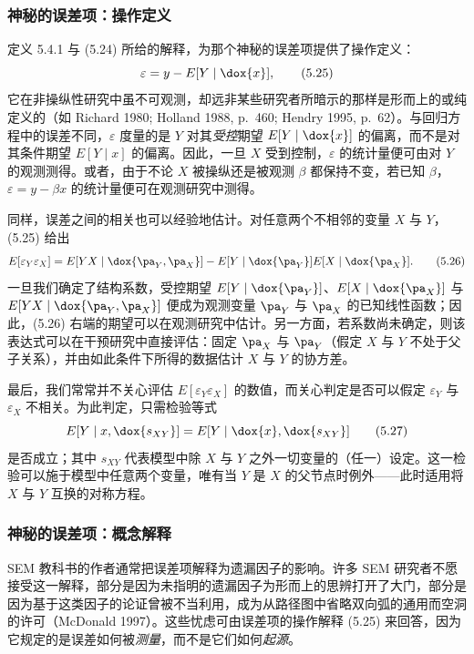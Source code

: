 \subsubsection*{神秘的误差项：操作定义}

定义 5.4.1 与 \textup{(5.24)} 所给的解释，为那个神秘的误差项提供了操作定义：
\begin{equation}
\varepsilon=y-E[Y\mid \dox{x}], \tag{5.25}
\end{equation}
它在非操纵性研究中虽不可观测，却远非某些研究者所暗示的那样是形而上的或纯定义的（如 Richard 1980; Holland 1988, p.~460; Hendry 1995, p.~62）。与回归方程中的误差不同，$\varepsilon$ 度量的是 $Y$ 对其\emph{受控}期望 $E[Y\mid \dox{x}]$ 的偏离，而不是对其条件期望 $E[Y\mid x]$ 的偏离。因此，一旦 $X$ 受到控制，$\varepsilon$ 的统计量便可由对 $Y$ 的观测测得。或者，由于不论 $X$ 被操纵还是被观测 $\beta$ 都保持不变，若已知 $\beta$，$\varepsilon=y-\beta x$ 的统计量便可在观测研究中测得。

同样，误差之间的相关也可以经验地估计。对任意两个不相邻的变量 $X$ 与 $Y$，\textup{(5.25)} 给出
\begin{equation}
E[\varepsilon_Y\varepsilon_X]=E[YX\mid \dox{\pa_Y,\pa_X}]-E[Y\mid \dox{\pa_Y}]E[X\mid \dox{\pa_X}]. \tag{5.26}
\end{equation}
一旦我们确定了结构系数，受控期望 $E[Y\mid \dox{\pa_Y}]$、$E[X\mid \dox{\pa_X}]$ 与 $E[YX\mid \dox{\pa_Y,\pa_X}]$ 便成为观测变量 $\pa_Y$ 与 $\pa_X$ 的已知线性函数；因此，\textup{(5.26)} 右端的期望可以在观测研究中估计。另一方面，若系数尚未确定，则该表达式可以在干预研究中直接评估：固定 $\pa_X$ 与 $\pa_Y$（假定 $X$ 与 $Y$ 不处于父子关系），并由如此条件下所得的数据估计 $X$ 与 $Y$ 的协方差。

最后，我们常常并不关心评估 $E[\varepsilon_Y\varepsilon_X]$ 的数值，而关心判定是否可以假定 $\varepsilon_Y$ 与 $\varepsilon_X$ 不相关。为此判定，只需检验等式
\begin{equation}
E[Y\mid x,\dox{s_{XY}}]=E[Y\mid \dox{x},\dox{s_{XY}}] \tag{5.27}
\end{equation}
是否成立；其中 $s_{XY}$ 代表模型中除 $X$ 与 $Y$ 之外一切变量的（任一）设定。这一检验可以施于模型中任意两个变量，唯有当 $Y$ 是 $X$ 的父节点时例外——此时适用将 $X$ 与 $Y$ 互换的对称方程。

\subsubsection*{神秘的误差项：概念解释}

SEM 教科书的作者通常把误差项解释为遗漏因子的影响。许多 SEM 研究者不愿接受这一解释，部分是因为未指明的遗漏因子为形而上的思辨打开了大门，部分是因为基于这类因子的论证曾被不当利用，成为从路径图中省略双向弧的通用而空洞的许可（McDonald 1997）。这些忧虑可由误差项的操作解释 \textup{(5.25)} 来回答，因为它规定的是误差如何被\emph{测量}，而不是它们如何\emph{起源}。

